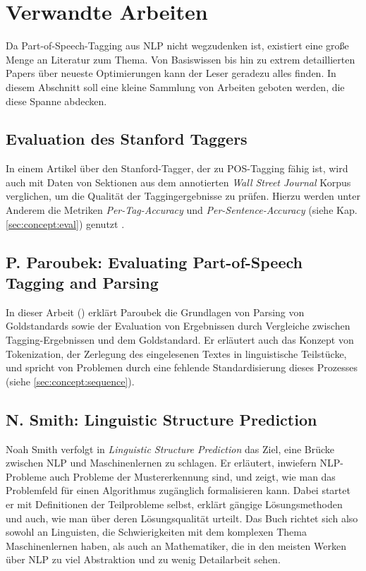 \section{Verwandte Arbeiten}
\label{sec:related:r}

Da Part-of-Speech-Tagging aus NLP nicht wegzudenken ist, existiert eine große Menge an Literatur zum Thema. Von Basiswissen bis hin zu extrem detaillierten Papers über neueste Optimierungen kann der Leser geradezu alles finden. In diesem Abschnitt soll eine kleine Sammlung von Arbeiten geboten werden, die diese Spanne abdecken.

\subsection{Evaluation des Stanford Taggers}
\label{sec:related:r:stanford}
In einem Artikel über den Stanford-Tagger, der zu POS-Tagging fähig ist, wird auch mit Daten von Sektionen aus dem annotierten \textit{Wall Street Journal} Korpus verglichen, um die Qualität der Taggingergebnisse zu prüfen. Hierzu werden unter Anderem die Metriken \textit{Per-Tag-Accuracy} und \textit{Per-Sentence-Accuracy} (siehe Kap. \ref{sec:concept:eval}) genutzt \cite{Paper:StanfordTagger}.

\subsection{P. Paroubek: Evaluating Part-of-Speech Tagging and Parsing}

In dieser Arbeit (\cite{paroubek}) erklärt Paroubek die Grundlagen von Parsing von Goldstandards sowie der Evaluation von Ergebnissen durch Vergleiche zwischen Tagging-Ergebnissen und dem Goldstandard. Er erläutert auch das Konzept von Tokenization, der Zerlegung des eingelesenen Textes in linguistische Teilstücke, und spricht von Problemen durch eine fehlende Standardisierung dieses Prozesses (siehe \ref{sec:concept:sequence}).

\subsection{N. Smith: Linguistic Structure Prediction}

Noah Smith verfolgt in \textit{Linguistic Structure Prediction} \cite{Smith} das Ziel, eine Brücke zwischen NLP und Maschinenlernen zu schlagen. Er erläutert, inwiefern NLP-Probleme auch Probleme der Mustererkennung sind, und zeigt, wie man das Problemfeld für einen Algorithmus zugänglich formalisieren kann. Dabei startet er mit Definitionen der Teilprobleme selbst, erklärt gängige Lösungsmethoden und auch, wie man über deren Lösungsqualität urteilt. Das Buch richtet sich also sowohl an Linguisten, die Schwierigkeiten mit dem komplexen Thema Maschinenlernen haben, als auch an Mathematiker, die in den meisten Werken über NLP zu viel Abstraktion und zu wenig Detailarbeit sehen.



